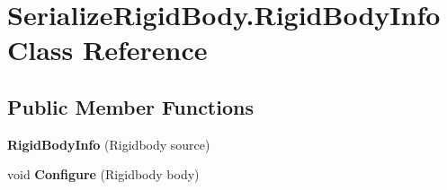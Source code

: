 \hypertarget{class_serialize_rigid_body_1_1_rigid_body_info}{}\section{Serialize\+Rigid\+Body.\+Rigid\+Body\+Info Class Reference}
\label{class_serialize_rigid_body_1_1_rigid_body_info}
\subsection*{Public Member Functions}
\begin{DoxyCompactItemize}
\item 
\mbox{\label{class_serialize_rigid_body_1_1_rigid_body_info_a01446d84b253e20edd369dd50bb4861d}} 
{\bfseries Rigid\+Body\+Info} (Rigidbody source)
\item 
\mbox{\label{class_serialize_rigid_body_1_1_rigid_body_info_aecc6136184351a86d80d18bdba75bf27}} 
void {\bfseries Configure} (Rigidbody body)
\end{DoxyCompactItemize}
